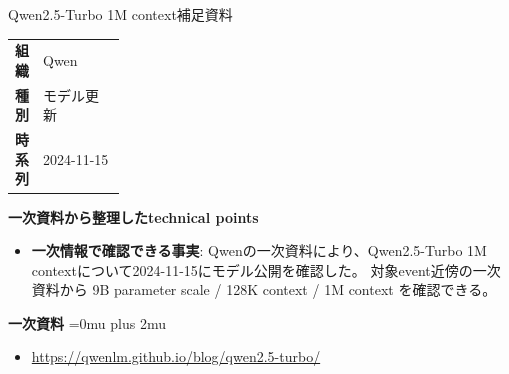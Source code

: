 \begin{technicalnote}{Qwen2.5-Turbo 1M context}{補足資料}
\begingroup
\begin{tabularx}{\linewidth}{@{}>{\bfseries}p{0.22\linewidth}X@{}}
組織 & Qwen \\
種別 & モデル更新 \\
時系列 & 2024-11-15 \\
\end{tabularx}
\smallskip
{\bfseries 一次資料から整理したtechnical points}
\begin{itemize}[leftmargin=1.5em,itemsep=0.35em]
\item \textbf{一次情報で確認できる事実}: Qwenの一次資料により、Qwen2.5-Turbo 1M contextについて2024-11-15にモデル公開を確認した。 対象event近傍の一次資料から 9B parameter scale / 128K context / 1M context を確認できる。
\end{itemize}
\begin{minipage}{\linewidth}
\begin{samepage}
{\bfseries 一次資料}
\begingroup\sloppy
\Urlmuskip=0mu plus 2mu\relax
\begin{itemize}[leftmargin=1.5em,itemsep=0.25em]
\item {\scriptsize\url{https://qwenlm.github.io/blog/qwen2.5-turbo/}}
\end{itemize}
\endgroup
\end{samepage}
\end{minipage}
\endgroup
\end{technicalnote}
\medskip

